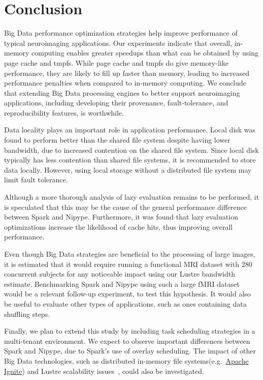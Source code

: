 \section{Conclusion} %
\label{sec:inmem:conclusion}

Big Data performance optimization strategies help improve performance of typical
neuroimaging applications. Our experiments indicate that overall, in-memory
computing enables greater speedups than what can be obtained by using page cache
and tmpfs. While page cache and tmpfs do give memory-like performance, they are
likely to fill up faster than memory, leading to increased performance penalties
when compared to in-memory computing. We conclude that extending Big Data
processing engines to better support neuroimaging applications, including
developing their provenance, fault-tolerance, and reproducibility features, is
worthwhile.

Data locality plays an important role in application performance. Local disk was
found to perform better than the shared file system despite having lower
bandwidth, due to increased contention on the shared file system. Since local
disk typically has less contention than shared file systems, it is recommended to
store data locally. However, using local storage without a distributed file
system may limit fault tolerance.

Although a more thorough analysis of lazy evaluation remains to be performed, it
is speculated that this may be the cause of the general performance difference
between Spark and Nipype. Furthermore, it was found that lazy evaluation
optimizations increase the likelihood of cache hits, thus improving overall
performance.

Even though Big Data strategies are beneficial to the processing of large
images, it is estimated that it would require running a functional MRI dataset
with 280 concurrent subjects for any noticeable impact using our Lustre
bandwidth estimate. Benchmarking Spark and Nipype using such a large fMRI
dataset would be a relevant follow-up experiment, to test this hypothesis. It
would also be useful to evaluate other types of applications, such as ones
containing data shuffling steps.

Finally, we plan to extend this study by including task scheduling strategies in
a multi-tenant environment. We expect to observe important differences between
Spark and Nipype, due to Spark's use of overlay scheduling. The impact of other
Big Data technologies, such as distributed in-memory file
systems(e.g.~\href{https://ignite.apache.org}{Apache Ignite}) and Lustre
scalability issues~\cite{sparkhpc}, could also be investigated.